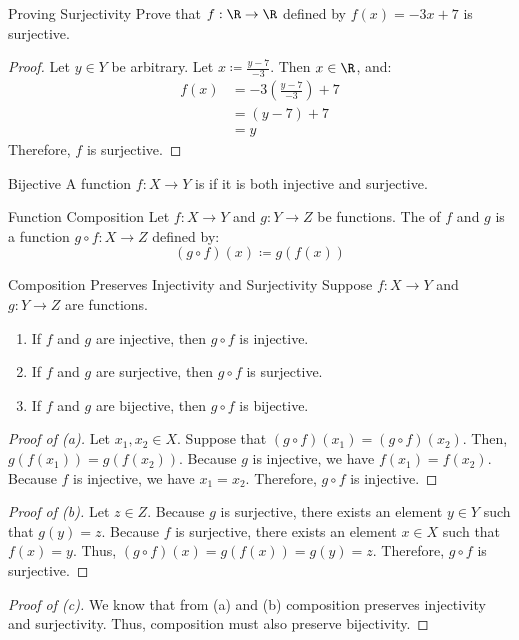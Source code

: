 \begin{exbox}{Proving Surjectivity}{}
    Prove that $f : \R \to \R$ defined by $f(x) = -3x+7$ is surjective.
    \tcblower
    \begin{proof}
        Let $y \in Y$ be arbitrary. Let $x \coloneq \frac{y-7}{-3}$. Then $x \in \R$, and:
        \begin{align*}
            f(x)
            &= -3 \left( \frac{y-7}{-3} \right) + 7 \\
            &= (y-7) + 7 \\
            &= y
        \end{align*}
        Therefore, $f$ is surjective.
    \end{proof}
\end{exbox}

\begin{dfnbox}{Bijective}{}
    A function $f : X \to Y$ is  if it is both injective and surjective.
\end{dfnbox}

\begin{dfnbox}{Function Composition}{}
    Let $f : X \to Y$ and $g : Y \to Z$ be functions. The  of $f$ and $g$ is a function $g \circ f : X \to Z$ defined by:
    \[ (g \circ f) (x) \coloneq g(f(x)) \]
\end{dfnbox}

\begin{thmbox}{Composition Preserves Injectivity and Surjectivity}{}
    Suppose $f : X \to Y$ and $g : Y \to Z$ are functions.
    \begin{enumerate}[label=(\alph*)]
        \item If $f$ and $g$ are injective, then $g \circ f$ is injective.
        \item If $f$ and $g$ are surjective, then $g \circ f$ is surjective.
        \item If $f$ and $g$ are bijective, then $g \circ f$ is bijective.
    \end{enumerate}
    \tcblower
    \begin{proof}[Proof of (a)]
        Let $x_1, x_2 \in X$. Suppose that $(g \circ f)(x_1) = (g \circ f)(x_2)$. Then, $g(f(x_1)) = g(f(x_2))$. Because $g$ is injective, we have $f(x_1) = f(x_2)$. Because $f$ is injective, we have $x_1 = x_2$. Therefore, $g \circ f$ is injective.
    \end{proof}

    \begin{proof}[Proof of (b)]
        Let $z \in Z$. Because $g$ is surjective, there exists an element $y \in Y$ such that $g(y) = z$. Because $f$ is surjective, there exists an element $x \in X$ such that $f(x) = y$. Thus, $(g \circ f)(x) = g(f(x)) = g(y) = z$. Therefore, $g \circ f$ is surjective.
    \end{proof}

    \begin{proof}[Proof of (c)]
        We know that from (a) and (b) composition preserves injectivity and surjectivity. Thus, composition must also preserve bijectivity.
    \end{proof}
\end{thmbox}

